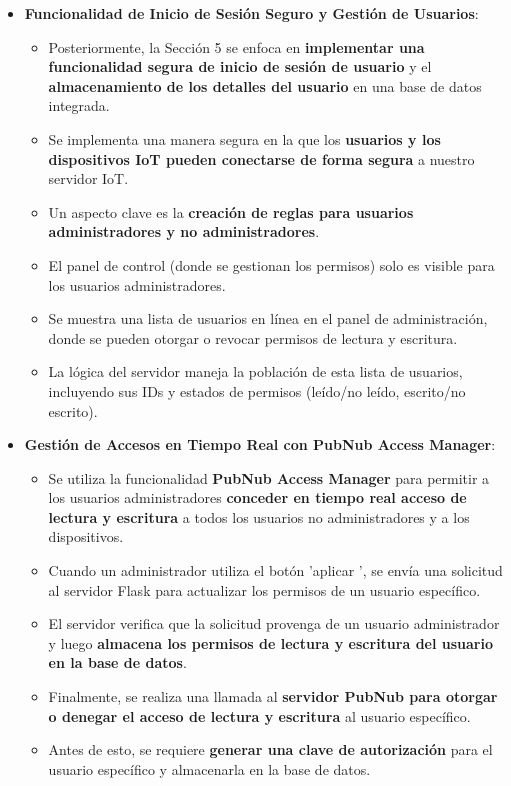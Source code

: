 \documentclass{report}
\begin{document}
\begin{itemize}
    \item \textbf{Funcionalidad de Inicio de Sesión Seguro y Gestión de Usuarios}:
    \begin{itemize}
        \item Posteriormente, la Sección 5 se enfoca en \textbf{implementar una funcionalidad segura de inicio de sesión de usuario} y el 
        \textbf{almacenamiento de los detalles del usuario} en una base de datos integrada.
        \item Se implementa una manera segura en la que los \textbf{usuarios y los dispositivos IoT pueden conectarse de forma segura} a nuestro 
        servidor IoT.
        \item Un aspecto clave es la \textbf{creación de reglas para usuarios administradores y no administradores}.
        \item El panel de control (donde se gestionan los permisos) solo es visible para los usuarios administradores.
        \item Se muestra una lista de usuarios en línea en el panel de administración, donde se pueden otorgar o revocar permisos de lectura y escritura.
        \item La lógica del servidor maneja la población de esta lista de usuarios, incluyendo sus IDs y estados de permisos (leído/no leído, 
        escrito/no escrito).
    \end{itemize}
    \item \textbf{Gestión de Accesos en Tiempo Real con PubNub Access Manager}:
    \begin{itemize}
        \item Se utiliza la funcionalidad \textbf{PubNub Access Manager} para permitir a los usuarios administradores \textbf{conceder en tiempo real acceso 
        de lectura y escritura} a todos los usuarios no administradores y a los dispositivos.
        \item Cuando un administrador utiliza el botón  'aplicar ', se envía una solicitud al servidor Flask para actualizar los permisos de un usuario 
        específico.
        \item El servidor verifica que la solicitud provenga de un usuario administrador y luego \textbf{almacena los permisos de lectura y escritura del 
        usuario en la base de datos}.
        \item Finalmente, se realiza una llamada al \textbf{servidor PubNub para otorgar o denegar el acceso de lectura y escritura} al usuario específico.
        \item Antes de esto, se requiere \textbf{generar una clave de autorización} para el usuario específico y almacenarla en la base de datos.
    \end{itemize}
\end{itemize}
\end{document}

